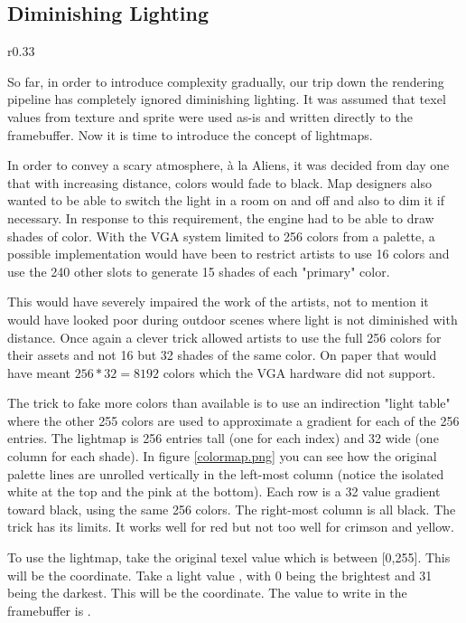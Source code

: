 \subsection{Diminishing Lighting}
\label{diminishedlightning}
\begin{wrapfigure}[11]{r}{0.33\textwidth}
\centering
{}
\end{wrapfigure}
So far, in order to introduce complexity gradually, our trip down the rendering pipeline has completely ignored diminishing lighting. It was assumed that texel values from texture and sprite were used as-is and written directly to the framebuffer. Now it is time to introduce the concept of lightmaps.\\
\par
In order to convey a scary atmosphere, \`a la Aliens, it was decided from day one that with increasing distance, colors would fade to black. Map designers also wanted to be able to switch the light in a room on and off and also to dim it if necessary. In response to this requirement, the engine had to be able to draw shades of color. With the VGA system limited to 256 colors from a palette, a possible implementation would have been to restrict artists to use 16 colors and use the 240 other slots to generate 15 shades of each "primary" color.\\
\par
This would have severely impaired the work of the artists, not to mention it would have looked poor during outdoor scenes where light is not diminished with distance. Once again a clever trick allowed artists to use the full 256 colors for their assets and not 16 but 32 shades of the same color. On paper that would have meant $256 * 32 = 8192$ colors which the VGA hardware did not support.\\
\par
 The trick to fake more colors than available is to use an indirection "light table" where the other 255 colors are used to approximate a gradient for each of the 256 entries. The lightmap is 256 entries tall (one for each index) and 32 wide (one column for each shade). In figure \ref{colormap.png} you can see how the original palette lines are unrolled vertically in the left-most column (notice the isolated white at the top and the pink at the bottom). Each row is a 32 value gradient toward black, using the same 256 colors. The right-most column is all black. The trick has its limits. It works well for red but not too well for crimson and yellow.\\
 \par
 To use the lightmap, take the original texel value  which is between [0,255]. This will be the  coordinate. Take a light value , with 0 being the brightest and 31 being the darkest. This will be the  coordinate. The value to write in the framebuffer is .\\
 \par
{}





